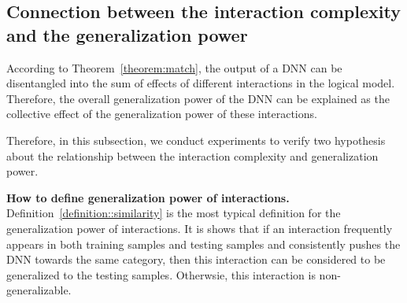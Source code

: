 \documentclass[10pt,twocolumn,letterpaper]{article}
\begin{document}
\subsection{Connection between the interaction complexity and the generalization power}\label{ref::sec3.2}
According to Theorem~\ref{theorem:match}, the output of a DNN can be disentangled into the sum of effects of different interactions in the logical model.
Therefore, the overall generalization power of the DNN can be explained as the collective effect of the generalization power of these interactions.


Therefore, in this subsection, we conduct experiments to verify two hypothesis about the relationship between the interaction complexity and generalization power.

\textbf{How to define generalization power of interactions.} Definition~\ref{definition::similarity} is the most typical definition for the generalization power of interactions. It is shows that if an interaction frequently appears in both training samples and testing samples and consistently pushes the DNN towards the same category,  then this interaction can be considered to be generalized to the testing samples. Otherwsie, this interaction is non-generalizable.
\end{document}
